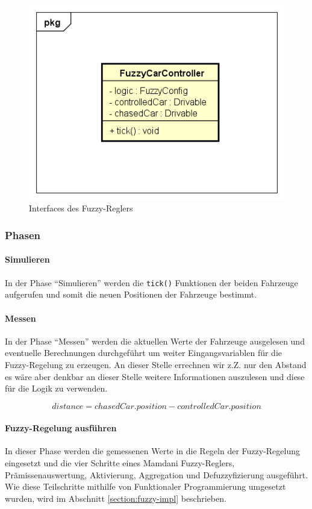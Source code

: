 \documentclass[12pt,a4paper,bibliography=totocnumbered,listof=totocnumbered, abstracton]{scrartcl}
\def\code#1{\texttt{#1}}
\theoremstyle{Umgebung}
\begin{document}
\begin{figure}
	\centering
	\includegraphics[width=0.4\linewidth]{img/practical/controller-diagram}
	\caption{Interfaces des Fuzzy-Reglers}
	\label{fig:controller-diagram}
\end{figure}

\subsubsection{Phasen}

\paragraph{Simulieren}

In der Phase \enquote{Simulieren} werden die \code{tick()} Funktionen der beiden Fahrzeuge aufgerufen und somit die neuen Positionen der Fahrzeuge bestimmt.

\paragraph{Messen}

In der Phase \enquote{Messen} werden die aktuellen Werte der Fahrzeuge ausgelesen und eventuelle Berechnungen durchgeführt um weiter Eingangsvariablen für die Fuzzy-Regelung zu erzeugen. An dieser Stelle errechnen wir z.Z. nur den Abstand es wäre aber denkbar an dieser Stelle weitere Informationen auszulesen und diese für die Logik zu verwenden.

\begin{equation}
	distance = chasedCar.position - controlledCar.position
\end{equation}

\paragraph{Fuzzy-Regelung ausführen}

In dieser Phase werden die gemessenen Werte in die Regeln der Fuzzy-Regelung eingesetzt und die vier Schritte eines Mamdani Fuzzy-Reglers, Prämissenauswertung, Aktivierung, Aggregation und Defuzzyfizierung ausgeführt. Wie diese Teilschritte mithilfe von Funktionaler Programmierung umgesetzt wurden, wird im Abschnitt \ref{section:fuzzy-impl} beschrieben.
\end{document}
